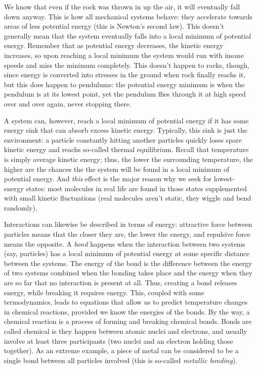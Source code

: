 \documentclass{article}
\begin{document}
We know that even if the rock was thrown in up the air, it will eventually fall down anyway. This is how all mechanical systems behave: they accelerate towards areas of less potential energy (this is Newton's second law). This doesn't generally mean that the system eventually falls into a local minimum of potential energy. Remember that as potential energy decreases, the kinetic energy increases, so upon reaching a local minimum the system would run with insane speeds and miss the minimum completely. This doesn't happen to rocks, though, since energy is converted into stresses in the ground when rock finally reachs it, but this does happen to pendulums: the potential energy minimum is when the pendulum is at its lowest point, yet the pendulum flies through it at high speed over and over again, never stopping there.

A system can, however, reach a local minimum of potential energy if it has some energy sink that can absorb excess kinetic energy. Typically, this sink is just the environment: a particle constantly hitting another particles quickly loses spare kinetic energy and reachs so-called thermal equilibrium. Recall that temperature is simply average kinetic energy; thus, the lower the surrounding temperature, the higher are the chances the the system will be found in a local minimum of potential energy. And \textit{this} effect is the major reason why we seek for lowest-energy states: most molecules in real life are found in those states supplemented with small kinetic fluctuations (real molecules aren't static, they wiggle and bend randomly).

Interactions can likewise be described in terms of energy: attractive force between particles means that the closer they are, the lower the energy, and repulsive force means the opposite. A \textit{bond} happens when the interaction between two systems (say, particles) has a local minimum of potential energy at some specific distance between the systems. The energy of the bond is the difference between the energy of two systems combined when the bonding takes place and the energy when they are so far that no interaction is present at all. Thus, creating a bond releases energy, while breaking it requires energy. This, coupled with some termodynamics, leads to equations that allow us to predict temperature changes in chemical reactions, provided we know the energies of the bonds. By the way, a chemical reaction is a process of forming and breaking chemical bonds. Bonds are called chemical is they happen between atomic nuclei and electrons, and usually involve at least three participants (two nuclei and an electron holding those together). As an extreme example, a piece of metal can be considered to be a single bond between all particles involved (this is so-called \textit{metallic bonding}).
\end{document}
